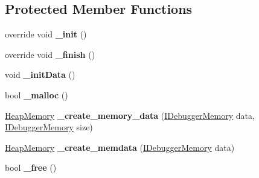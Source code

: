\subsection*{Protected Member Functions}
\begin{DoxyCompactItemize}
\item 
\hypertarget{classlib_watcher_dialog_1_1_combine_rules_1_1_breakpoint_trigger_from_a_p_i_aa4bd691080cfcfc33b02cb0449c5eac8}{override void {\bfseries \+\_\+init} ()}\label{classlib_watcher_dialog_1_1_combine_rules_1_1_breakpoint_trigger_from_a_p_i_aa4bd691080cfcfc33b02cb0449c5eac8}

\item 
\hypertarget{classlib_watcher_dialog_1_1_combine_rules_1_1_breakpoint_trigger_from_a_p_i_acd1491dc2931e043ddae781e2e171c98}{override void {\bfseries \+\_\+finish} ()}\label{classlib_watcher_dialog_1_1_combine_rules_1_1_breakpoint_trigger_from_a_p_i_acd1491dc2931e043ddae781e2e171c98}

\item 
\hypertarget{classlib_watcher_dialog_1_1_combine_rules_1_1_breakpoint_trigger_from_a_p_i_a420f4919f8e0901e64827a327b2cf247}{void {\bfseries \+\_\+init\+Data} ()}\label{classlib_watcher_dialog_1_1_combine_rules_1_1_breakpoint_trigger_from_a_p_i_a420f4919f8e0901e64827a327b2cf247}

\item 
\hypertarget{classlib_watcher_dialog_1_1_combine_rules_1_1_breakpoint_trigger_from_a_p_i_a94038d43926441502a5fd7abb63789ca}{bool {\bfseries \+\_\+malloc} ()}\label{classlib_watcher_dialog_1_1_combine_rules_1_1_breakpoint_trigger_from_a_p_i_a94038d43926441502a5fd7abb63789ca}

\item 
\hypertarget{classlib_watcher_dialog_1_1_combine_rules_1_1_breakpoint_trigger_from_a_p_i_a84312c6bd1303abd0dd683f0a461852c}{\hyperlink{classlib_wather_debugger_1_1_memory_1_1_heap_memory}{Heap\+Memory} {\bfseries \+\_\+create\+\_\+memory\+\_\+data} (\hyperlink{interfacelib_utilities_1_1_i_debugger_memory}{I\+Debugger\+Memory} data, \hyperlink{interfacelib_utilities_1_1_i_debugger_memory}{I\+Debugger\+Memory} size)}\label{classlib_watcher_dialog_1_1_combine_rules_1_1_breakpoint_trigger_from_a_p_i_a84312c6bd1303abd0dd683f0a461852c}

\item 
\hypertarget{classlib_watcher_dialog_1_1_combine_rules_1_1_breakpoint_trigger_from_a_p_i_a52b0ecb573bee592ab82a40e661604a3}{\hyperlink{classlib_wather_debugger_1_1_memory_1_1_heap_memory}{Heap\+Memory} {\bfseries \+\_\+create\+\_\+memdata} (\hyperlink{interfacelib_utilities_1_1_i_debugger_memory}{I\+Debugger\+Memory} data)}\label{classlib_watcher_dialog_1_1_combine_rules_1_1_breakpoint_trigger_from_a_p_i_a52b0ecb573bee592ab82a40e661604a3}

\item 
\hypertarget{classlib_watcher_dialog_1_1_combine_rules_1_1_breakpoint_trigger_from_a_p_i_a381b61275f8429965981c294cd0dc698}{bool {\bfseries \+\_\+free} ()}\label{classlib_watcher_dialog_1_1_combine_rules_1_1_breakpoint_trigger_from_a_p_i_a381b61275f8429965981c294cd0dc698}

\end{DoxyCompactItemize}
